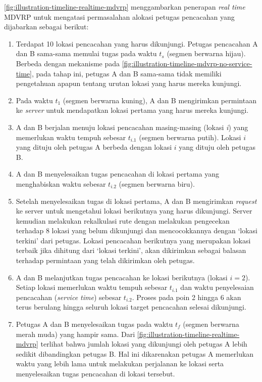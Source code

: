 \autoref{fig:illustration-timeline-realtime-mdvrp} menggambarkan penerapan \textit{real time} MDVRP untuk mengatasi permasalahan alokasi petugas pencacahan yang dijabarkan sebagai berikut:
\begin{enumerate}
	\item Terdapat 10 lokasi pencacahan yang harus dikunjungi. Petugas pencacahan A dan B sama-sama memulai tugas pada waktu $t_{s}$ (segmen berwarna hijau). Berbeda dengan mekanisme pada \autoref{fig:illustration-timeline-mdvrp-no-service-time}, pada tahap ini, petugas A dan B sama-sama tidak memiliki pengetahuan apapun tentang urutan lokasi yang harus mereka kunjungi. 
	\item Pada waktu $t_{1}$ (segmen berwarna kuning), A dan B mengirimkan permintaan ke \textit{server} untuk mendapatkan lokasi pertama yang harus mereka kunjungi. 
	\item A dan B berjalan menuju lokasi pencacahan masing-masing (lokasi \textit{i}) yang memerlukan waktu tempuh sebesar $t_{i.1}$ (segmen berwarna putih). Lokasi $i$ yang dituju oleh petugas A berbeda dengan lokasi $i$ yang dituju oleh petugas B.
	\item A dan B menyelesaikan tugas pencacahan di lokasi pertama yang menghabiskan waktu sebesar $t_{i.2}$ (segmen berwarna biru).
	\item Setelah menyelesaikan tugas di lokasi pertama, A dan B mengirimkan \textit{request} ke server untuk mengetahui lokasi berikutnya yang harus dikunjungi. Server kemudian melakukan rekalkulasi rute dengan melakukan pengecekan terhadap 8 lokasi yang belum dikunjungi dan mencocokkannya dengan `lokasi terkini' dari petugas. Lokasi pencacahan berikutnya yang merupakan lokasi terbaik jika dihitung dari `lokasi terkini', akan dikirimkan sebagai balasan terhadap permintaan yang telah dikirimkan oleh petugas. 
	\item A dan B melanjutkan tugas pencacahan ke lokasi berikutnya (lokasi $i = 2$). Setiap lokasi memerlukan waktu tempuh sebesar $t_{i.1}$ dan waktu penyelesaian pencacahan (\textit{service time}) sebesar $t_{i.2}$. Proses pada poin 2 hingga 6 akan terus berulang hingga seluruh lokasi target pencacahan selesai dikunjungi. 
	\item Petugas A dan B menyelesaikan tugas pada waktu $t_{f}$ (segmen berwarna merah muda) yang hampir sama. Dari \autoref{fig:illustration-timeline-realtime-mdvrp} terlihat bahwa jumlah lokasi yang dikunjungi oleh petugas A lebih sedikit dibandingkan petugas B. Hal ini dikarenakan petugas A memerlukan waktu yang lebih lama untuk melakukan perjalanan ke lokasi serta menyelesaikan tugas pencacahan di lokasi tersebut. 
\end{enumerate}


